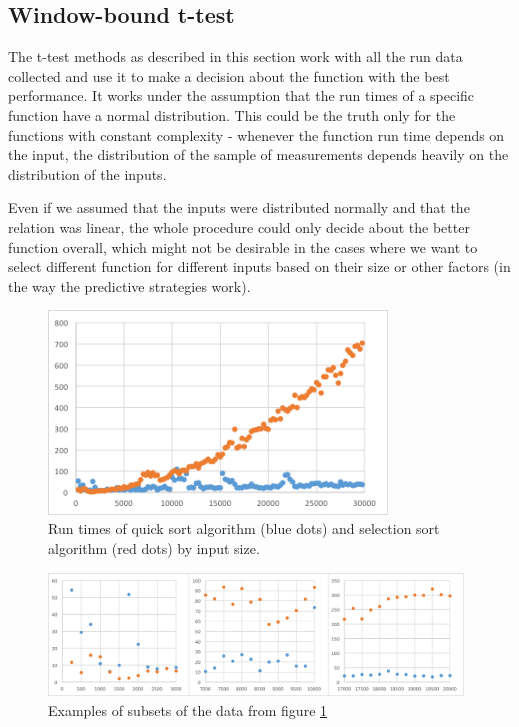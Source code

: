 \subsection{Window-bound t-test}

The t-test methods as described in this section work with all the run data collected and use it to make a decision about the function with the best performance. It works under the assumption that the run times of a specific function have a normal distribution. This could be the truth only for the functions with constant complexity - whenever the function run time depends on the input, the distribution of the sample of measurements depends heavily on the distribution of the inputs.

Even if we assumed that the inputs were distributed normally and that the relation was linear, the whole procedure could only decide about the better function overall, which might not be desirable in the cases where we want to select different function for different inputs based on their size or other factors (in the way the predictive strategies work).

\begin{figure}[h!]
	\centerline{\mbox{\includegraphics[width=90mm]{./img/quick_vs_selection.png}}}
	\caption{Run times of quick sort algorithm (blue dots) and selection sort algorithm (red dots) by input size.}
	\label{fig:quick_vs_selection}
\end{figure}

\begin{figure}[h!]
	\centerline{\mbox{\includegraphics[width=110mm]{./img/window_t_test_examples.png}}}
	\caption{Examples of subsets of the data from figure \ref{fig:quick_vs_selection}}
	\label{fig:window_t_test_examples}
\end{figure}


